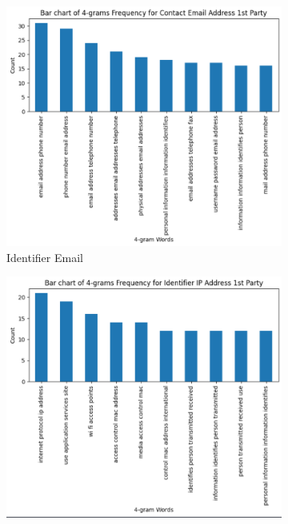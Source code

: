 \begin{figure}[!ht]
	\medskip
  
	\begin{subfigure}[t]{.5\textwidth}
	  \centering
	  \includegraphics[width=\linewidth]{figures/4_grams_email.png}
	  \caption{Identifier Email}
	\end{subfigure}
	\hfill
	\begin{subfigure}[t]{.5\textwidth}
	  \centering
	  \includegraphics[width=\linewidth]{figures/4_grams_ip_address.png}

\end{subfigure}
\end{figure}
